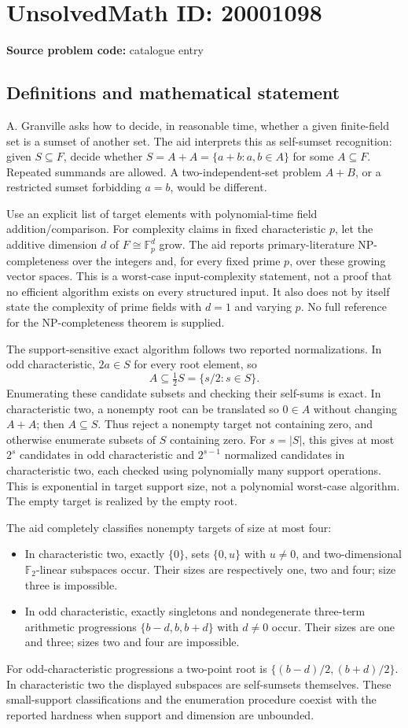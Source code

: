 \documentclass[11pt]{article}
\newcommand{\F}{\mathbb{F}}
\begin{document}
\section*{UnsolvedMath ID: 20001098}
\textbf{Source problem code:} catalogue entry
\subsection{Definitions and mathematical statement}
A. Granville asks how to decide, in reasonable time, whether a given finite-field set is a sumset of another set. The aid interprets this as self-sumset recognition: given $S\subseteq F$, decide whether $S=A+A=\{a+b:a,b\in A\}$ for some $A\subseteq F$. Repeated summands are allowed. A two-independent-set problem $A+B$, or a restricted sumset forbidding $a=b$, would be different.

Use an explicit list of target elements with polynomial-time field addition/comparison. For complexity claims in fixed characteristic $p$, let the additive dimension $d$ of $F\cong\F_p^d$ grow. The aid reports primary-literature NP-completeness over the integers and, for every fixed prime $p$, over these growing vector spaces. This is a worst-case input-complexity statement, not a proof that no efficient algorithm exists on every structured input. It also does not by itself state the complexity of prime fields with $d=1$ and varying $p$. No full reference for the NP-completeness theorem is supplied.

The support-sensitive exact algorithm follows two reported normalizations. In odd characteristic, $2a\in S$ for every root element, so
\[
 A\subseteq\tfrac12S=\{s/2:s\in S\}.
\]
Enumerating these candidate subsets and checking their self-sums is exact. In characteristic two, a nonempty root can be translated so $0\in A$ without changing $A+A$; then $A\subseteq S$. Thus reject a nonempty target not containing zero, and otherwise enumerate subsets of $S$ containing zero. For $s=|S|$, this gives at most $2^s$ candidates in odd characteristic and $2^{s-1}$ normalized candidates in characteristic two, each checked using polynomially many support operations. This is exponential in target support size, not a polynomial worst-case algorithm. The empty target is realized by the empty root.

The aid completely classifies nonempty targets of size at most four:
\begin{itemize}
\item In characteristic two, exactly $\{0\}$, sets $\{0,u\}$ with $u\neq0$, and two-dimensional $\F_2$-linear subspaces occur. Their sizes are respectively one, two and four; size three is impossible.
\item In odd characteristic, exactly singletons and nondegenerate three-term arithmetic progressions $\{b-d,b,b+d\}$ with $d\neq0$ occur. Their sizes are one and three; sizes two and four are impossible.
\end{itemize}
For odd-characteristic progressions a two-point root is $\{(b-d)/2,(b+d)/2\}$. In characteristic two the displayed subspaces are self-sumsets themselves. These small-support classifications and the enumeration procedure coexist with the reported hardness when support and dimension are unbounded.
\end{document}
